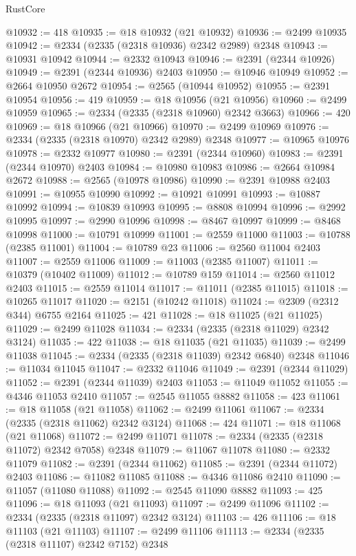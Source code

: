 \begin{lexlean}{RustCore}
\begin{coremodule}
@10932 := 418
@10935 := @18 @10932 (@21 @10932)
@10936 := @2499 @10935
@10942 := @2334 (@2335 (@2318 @10936) @2342 @2989) @2348
@10943 := @10931 @10942
@10944 := @2332 @10943
@10946 := @2391 (@2344 @10926)
@10949 := @2391 (@2344 @10936) @2403
@10950 := @10946 @10949
@10952 := @2664 @10950 @2672
@10954 := @2565 (@10944 @10952)
@10955 := @2391 @10954
@10956 := 419
@10959 := @18 @10956 (@21 @10956)
@10960 := @2499 @10959
@10965 := @2334 (@2335 (@2318 @10960) @2342 @3663)
@10966 := 420
@10969 := @18 @10966 (@21 @10966)
@10970 := @2499 @10969
@10976 := @2334 (@2335 (@2318 @10970) @2342 @2989) @2348
@10977 := @10965 @10976
@10978 := @2332 @10977
@10980 := @2391 (@2344 @10960)
@10983 := @2391 (@2344 @10970) @2403
@10984 := @10980 @10983
@10986 := @2664 @10984 @2672
@10988 := @2565 (@10978 @10986)
@10990 := @2391 @10988 @2403
@10991 := @10955 @10990
@10992 := @10921 @10991
@10993 := @10887 @10992
@10994 := @10839 @10993
@10995 := @8808 @10994
@10996 := @2992 @10995
@10997 := @2990 @10996
@10998 := @8467 @10997
@10999 := @8468 @10998
@11000 := @10791 @10999
@11001 := @2559 @11000
@11003 := @10788 (@2385 @11001)
@11004 := @10789 @23
@11006 := @2560 @11004 @2403
@11007 := @2559 @11006
@11009 := @11003 (@2385 @11007)
@11011 := @10379 (@10402 @11009)
@11012 := @10789 @159
@11014 := @2560 @11012 @2403
@11015 := @2559 @11014
@11017 := @11011 (@2385 @11015)
@11018 := @10265 @11017
@11020 := @2151 (@10242 @11018)
@11024 := @2309 (@2312 @344) @6755 @2164
@11025 := 421
@11028 := @18 @11025 (@21 @11025)
@11029 := @2499 @11028
@11034 := @2334 (@2335 (@2318 @11029) @2342 @3124)
@11035 := 422
@11038 := @18 @11035 (@21 @11035)
@11039 := @2499 @11038
@11045 := @2334 (@2335 (@2318 @11039) @2342 @6840) @2348
@11046 := @11034 @11045
@11047 := @2332 @11046
@11049 := @2391 (@2344 @11029)
@11052 := @2391 (@2344 @11039) @2403
@11053 := @11049 @11052
@11055 := @4346 @11053 @2410
@11057 := @2545 @11055 @8882
@11058 := 423
@11061 := @18 @11058 (@21 @11058)
@11062 := @2499 @11061
@11067 := @2334 (@2335 (@2318 @11062) @2342 @3124)
@11068 := 424
@11071 := @18 @11068 (@21 @11068)
@11072 := @2499 @11071
@11078 := @2334 (@2335 (@2318 @11072) @2342 @7058) @2348
@11079 := @11067 @11078
@11080 := @2332 @11079
@11082 := @2391 (@2344 @11062)
@11085 := @2391 (@2344 @11072) @2403
@11086 := @11082 @11085
@11088 := @4346 @11086 @2410
@11090 := @11057 (@11080 @11088)
@11092 := @2545 @11090 @8882
@11093 := 425
@11096 := @18 @11093 (@21 @11093)
@11097 := @2499 @11096
@11102 := @2334 (@2335 (@2318 @11097) @2342 @3124)
@11103 := 426
@11106 := @18 @11103 (@21 @11103)
@11107 := @2499 @11106
@11113 := @2334 (@2335 (@2318 @11107) @2342 @7152) @2348

\end{coremodule}
\end{lexlean}
